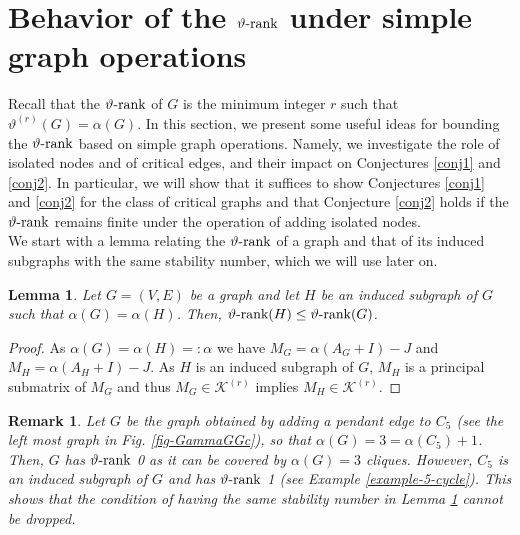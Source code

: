 \documentclass[11pt]{article}
\newtheorem{lemma}[theorem]{Lemma}
\newtheorem{remark}[theorem]{Remark}
\newtheorem{example}[theorem]{Example}
\numberwithin{equation}{section}
\newcommand{\MK}{{\mathcal K}}
\newcommand{\rrank}{\vartheta\text{\rm -rank}}
\begin{document}







\section{Behavior of the $\rrank$ under simple graph operations}\label{pre-iso-critical}

Recall that the $\rrank$ of $G$ is the minimum integer $r$ such that $\vartheta^{(r)}(G)=\alpha(G)$. In this section, we present some useful ideas  for bounding the $\rrank$ based on simple graph operations.
 Namely, we investigate the role of isolated nodes and of critical edges, and their impact on Conjectures \ref{conj1} and \ref{conj2}. In particular, we will show that it suffices to show Conjectures \ref{conj1} and \ref{conj2}  for the class of critical graphs and that Conjecture \ref{conj2} holds if the $\rrank$ remains finite under the operation of adding isolated nodes.
 \\
 
 We start with a lemma  relating  the $\rrank$ of a graph and that of its  induced subgraphs with the same stability number, which we will use later on.
 
\begin{lemma}\label{indu-same-alpha}
Let $G=(V,E)$ be a graph and let $H$ be an induced subgraph of $G$ such that $\alpha(G)=\alpha(H)$. Then, $\rrank(H)\leq \rrank(G)$. 
\end{lemma}
\begin{proof}
As $\alpha(G)=\alpha(H)=:\alpha$ we have $M_G=\alpha(A_G+I)-J$ and $M_H=\alpha(A_H+I)-J$. As $H$ is an induced subgraph of $G$,  $M_H$ is a principal submatrix of $M_G$ and thus  $M_G\in \MK^{(r)}$ implies $M_H\in \MK^{(r)}$.
\end{proof}

\begin{remark}
Let $G$ be the graph obtained by adding a pendant edge to $C_5$ (see the left most graph in Fig. \ref{fig-GammaGGc}), so that $\alpha(G)=3=\alpha(C_5)+1$. Then, $G$ has $\rrank$ 0 as it can be covered by $\alpha(G)=3$ cliques. However, $C_5$ is an induced subgraph of $G$ and has $\rrank$ 1 (see Example \ref{example-5-cycle}). %
This shows that the condition of having the same stability number in Lemma \ref{indu-same-alpha} cannot be dropped.  
\end{remark}
\end{document}
